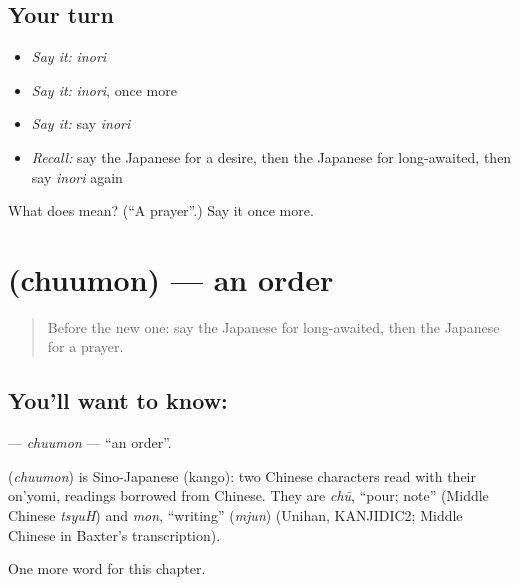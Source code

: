 \subsection*{Your turn}
\begin{itemize}
\raggedright
  \item \emph{Say it:} \emph{inori}
  \item \emph{Say it:} \emph{inori}, once more
  \item \emph{Say it:} say \emph{inori}
  \item \emph{Recall:} say the Japanese for a desire, then the Japanese for long-awaited, then say \emph{inori} again
\end{itemize}

\begin{tcolorbox}[breakable,colback=teal!4,colframe=teal!35!black,title={Before you move on}]
What does  mean? (\textquotedblleft{}A prayer\textquotedblright{}.) Say it once more.
\end{tcolorbox}
\section[\texorpdfstring{\ja{ちゅうもん} (chuumon)}{ちゅうもん (chuumon)}]{ (chuumon) — an order}

\label{lesson:JA-C93-chuumon}



\begin{quote}
Before the new one: say the Japanese for long-awaited, then the Japanese for a prayer.
\end{quote}

\subsection*{You'll want to know: }
\textbf{} — \emph{chuumon} — \textquotedblleft{}an order\textquotedblright{}.

\begin{cousinweb}
\textbf{} (\emph{chuumon}) is Sino-Japanese (kango): two Chinese characters read with their on'yomi, readings borrowed from Chinese. They are \emph{chū}, \textquotedblleft{}pour; note\textquotedblright{} (Middle Chinese \emph{tsyuH}) and \emph{mon}, \textquotedblleft{}writing\textquotedblright{} (\emph{mjun}) (Unihan, KANJIDIC2; Middle Chinese in Baxter's transcription).
\end{cousinweb}

\begin{grammarlens}[title={What you've built}]
One more word for this chapter.
\end{grammarlens}


